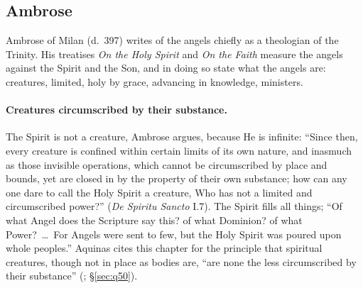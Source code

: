\sectionguard
\subsection{Ambrose}\label{sec:fl-ambrose}

Ambrose of Milan (d.~397) writes of the angels chiefly as a theologian of
the Trinity. His treatises \emph{On the Holy Spirit} and \emph{On the
Faith} measure the angels against the Spirit and the Son, and in doing so
state what the angels are: creatures, limited, holy by grace, advancing
in knowledge, ministers.

\paragraph{Creatures circumscribed by their substance.} The Spirit is not a
creature, Ambrose argues, because He is infinite: ``Since then, every
creature is confined within certain limits of its own nature, and
inasmuch as those invisible operations, which cannot be circumscribed by
place and bounds, yet are closed in by the property of their own
substance; how can any one dare to call the Holy Spirit a creature, Who
has not a limited and circumscribed power?'' (\emph{De Spiritu Sancto}
I.7). The Spirit fills all things; ``Of what Angel does the Scripture say
this? of what Dominion? of what Power?~\dots\ For Angels were sent to few,
but the Holy Spirit was poured upon whole peoples.'' Aquinas cites this
chapter for the principle that spiritual creatures, though not in place
as bodies are, ``are none the less circumscribed by their substance''
(; \S\ref{sec:q50}).

